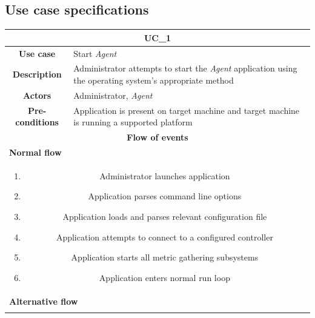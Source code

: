 \documentclass[12pt,a4paper,table]{article}
\begin{document}
        \pagebreak

        \subsection{Use case specifications}
            \begin{longtable}{ |c|p{11.8cm}| }
                \hline
                \multicolumn{2}{|c|}{\cellcolor{lime} \textbf{UC\_1}}\\ \hline
                \cellcolor[gray]{0.9} \textbf{Use case} & Start \textit{Agent}\\ \hline
                \cellcolor[gray]{0.9} \textbf{Description} & Administrator attempts to start the \textit{Agent} application using the operating system's appropriate method\\ \hline
                \cellcolor[gray]{0.9} \textbf{Actors} & Administrator, \textit{Agent}\\ \hline
                \cellcolor[gray]{0.9} \textbf{Pre-conditions} & Application is present on target machine and target machine is running a supported platform\\ \hline
                \multicolumn{2}{|c|}{\cellcolor[gray]{0.9} \textbf{Flow of events}}\\ \hline
                \multicolumn{2}{|l|}{\cellcolor[gray]{0.9} \textbf{Normal flow}}\\ \hline
                \multicolumn{2}{|p{14cm}|}{
                    \begin{enumerate}
                        \item Administrator launches application
                        \item Application parses command line options
                        \item Application loads and parses relevant configuration file
                        \item Application attempts to connect to a configured controller
                        \item Application starts all metric gathering subsystems
                        \item Application enters normal run loop
                    \end{enumerate}
                }\\ \hline
                \multicolumn{2}{|l|}{\cellcolor[gray]{0.9} \textbf{Alternative flow}}\\ \hline
                \multicolumn{2}{|p{14cm}|}{
                    \begin{itemize}

\end{itemize}}
\end{longtable}
\end{document}
